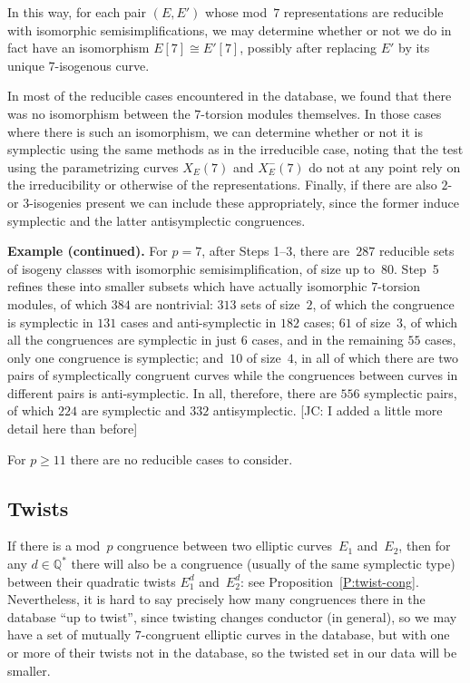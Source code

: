 \documentclass[12pt, reqno]{amsart}
\newcommand{\Q}{\mathbb{Q}}
\numberwithin{equation}{section}
\theoremstyle{definition}
\theoremstyle{remark}
\newcommand{\jc}[1]{{\color{darkgreen} \textsf{[JC: #1]}}}
\begin{document}

In this way, for each pair $(E,E')$ whose 
mod~$7$ representations
are reducible with isomorphic semisimplifications, we may determine
whether or not we do in fact have an isomorphism $E[7]\cong E'[7]$,
possibly after replacing $E'$ by its unique $7$-isogenous curve.

In most of the reducible cases encountered in the database, we found
that there was no isomorphism between the $7$-torsion modules
themselves.  In those cases where there is such an isomorphism, we can
determine whether or not it is symplectic using the same methods as in
the irreducible case, noting that the test using the parametrizing
curves $X_E(7)$ and $X_E^-(7)$ do not at any point rely on the
irreducibility or otherwise of the representations.  Finally, if there
are also $2$-{} or $3$-isogenies present we can include these
appropriately, since the former induce symplectic and the latter
antisymplectic congruences.

{\bf Example (continued).} For $p=7$, after Steps 1--3, there
are~$287$ reducible sets of isogeny classes with isomorphic
semisimplification, of size up to~$80$.  Step~5 refines these into
smaller subsets which have actually isomorphic $7$-torsion modules, of
which $384$ are nontrivial: $313$ sets of size~$2$, of which the
congruence is symplectic in $131$ cases and anti-symplectic in $182$
cases; $61$ of size~$3$, of which all the congruences are symplectic
in just $6$ cases, and in the remaining $55$ cases, only one
congruence is symplectic; and~$10$ of size~$4$, in all of which there
are two pairs of symplectically congruent curves while the congruences
between curves in different pairs is anti-symplectic.  In all,
therefore, there are $556$ symplectic pairs, of which $224$ are
symplectic and $332$ antisymplectic. \jc{I added a little more detail
  here than before}

For $p\ge11$ there are no reducible cases to consider.

\subsection{Twists}
If there is a mod~$p$ congruence between two elliptic curves~$E_1$
and~$E_2$, then for any $d\in\Q^*$ there will also be a congruence
(usually of the same symplectic type) between their quadratic twists
$E_1^d$ and~$E_2^d$: see Proposition~\ref{P:twist-cong}.
Nevertheless, it is hard to say precisely how many congruences there
in the database ``up to twist'', since twisting changes conductor (in
general), so we may have a set of mutually $7$-congruent elliptic
curves in the database, but with one or more of their twists not in
the database, so the twisted set in our data will be smaller.
\end{document}
